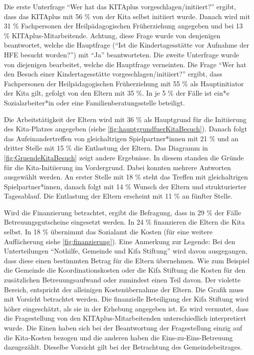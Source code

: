 \documentclass[
  ngerman,
  11pt,
  paper=a4,
  twoside,
  titlepage=true,
  openright,
  abstract=on,
  toc=listofnumbered,
  numbers=noenddot,
  chapterprefix=true,
  headings=optiontohead,
  svgnames,
  dvipsnames]{scrreprt}
\begin{document}
Die erste Unterfrage “Wer hat das KITAplus vorgeschlagen/initiiert?”
ergibt, dass das KITAplus mit 56 \% von der Kita selbst initiiert wurde.
Danach wird mit 31 \% Fachpersonen der Heilpädagogischen Früherziehung
angegeben und bei 13 \% KITAplus-Mitarbeitende. Achtung, diese Frage
wurde von denjenigen beantwortet, welche die Hauptfrage (“Ist die
Kindertagesstätte vor Aufnahme der HFE besucht worden?”) mit “Ja”
beantworteten. Die zweite Unterfrage wurde von diejenigen bearbeitet,
welche die Hauptfrage verneinten. Die Frage “Wer hat den Besuch einer
Kindertagesstätte vorgeschlagen/initiiert?” ergibt, dass Fachpersonen
der Heilpädagogischen Früherziehung mit 55 \% als Hauptinitiator der
Kita gilt, gefolgt von den Eltern mit 35 \%. In je 5 \% der Fälle ist
ein*e Sozialarbeiter*in oder eine Familienberatungsstelle beteiligt.

Die Arbeitstätigkeit der Eltern wird mit 36 \% als Hauptgrund für die
Initiierung des Kita-Platzes angegeben (siehe
\cref{fig:hauptgrundfuerKitaBesuch}). Danach folgt das
Aufeinandertreffen von gleichaltrigen Spielpartner*innen mit 21 \% und
an dritter Stelle mit 15 \% die Entlastung der Eltern. Das Diagramm in
\cref{fig:GruendeKitaBesuch} zeigt andere Ergebnisse. In diesem standen
die Gründe für die Kita-Initiierung im Vordergrund. Dabei konnten
mehrere Antworten ausgewählt werden. An erster Stelle mit 18 \% steht
das Treffen mit gleichaltrigen Spielpartner*innen, danach folgt mit 14
\% Wunsch der Eltern und strukturierter Tagesablauf. Die Entlastung der
Eltern erscheint mit 11 \% an fünfter Stelle.

Wird die Finanzierung betrachtet, ergibt die Befragung, dass in 29 \%
der Fälle Betreuungsgutscheine eingesetzt werden. In 24 \% finanzieren
die Eltern die Kita selbst. In 18 \% übernimmt das Sozialamt die Kosten
(für eine weitere Auffächerung siehe \cref{fig:finanzierung}). Eine
Anmerkung zur Legende: Bei den Unterteilungen “Nothilfe, Gemeinde und
Kifa Stiftung” wird davon ausgegangen, dass diese einen bestimmten
Betrag für die Eltern übernehmen. Wie zum Beispiel die Gemeinde die
Koordinationskosten oder die Kifa Stiftung die Kosten für den
zusätzlichen Betreuungsaufwand oder zumindest einen Teil davon. Der
violette Bereich, entspricht der alleinigen Kostenübernahme der Eltern.
Die Grafik muss mit Vorsicht betrachtet werden. Die finanzielle
Beteiligung der Kifa Stiftung wird höher eingeschätzt, als sie in der
Erhebung angegeben ist. Es wird vermutet, dass die Fragestellung von den
KITAplus-Mitarbeitenden unterschiedlich interpretiert wurde. Die Einen
haben sich bei der Beantwortung der Fragestellung einzig auf die
Kita-Kosten bezogen und die anderen haben die Eins-zu-Eins-Betreuung
dazugezählt. Dieselbe Vorsicht gilt bei der Betrachtung des
Gemeindebeitrages.
\end{document}
